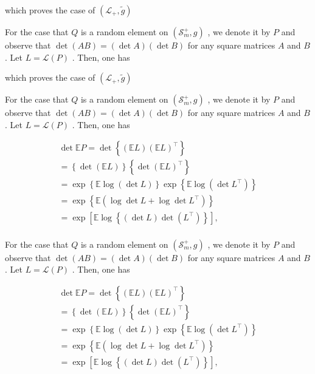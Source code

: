 \documentclass[11pt]{article}
\begin{document}
which proves the case of  $(\mathcal{L}_{+},\tilde{g})$

For the case that  $Q$  is a random element on  $(\mathcal{S}_m^+, g)$ , we denote it by  $P$  and observe that  $\operatorname{det}(AB) = (\operatorname{det} A)(\operatorname{det} B)$  for any square matrices  $A$  and  $B$ . Let  $L = \mathcal{L}(P)$ . Then, one has

which proves the case of  $(\mathcal{L}_{+},\tilde{g})$

For the case that  $Q$  is a random element on  $(\mathcal{S}_m^+, g)$ , we denote it by  $P$  and observe that  $\operatorname{det}(AB) = (\operatorname{det} A)(\operatorname{det} B)$  for any square matrices  $A$  and  $B$ . Let  $L = \mathcal{L}(P)$ . Then, one has

$$
\begin{array}{l} \det  \mathbb {E} P = \det  \left\{\left(\mathbb {E} L\right) \left(\mathbb {E} L\right) ^ {\top} \right\} \\ = \left\{\det  (\mathbb {E} L) \right\} \left\{\det  (\mathbb {E} L) ^ {\top} \right\} \\ = \exp \left\{\mathbb {E} \log (\det  L) \right\} \exp \left\{\mathbb {E} \log (\det  L ^ {\top}) \right\} \\ = \exp \left\{\mathbb {E} \left(\log \det  L + \log \det  L ^ {\top}\right) \right\} \\ = \exp \left[ \mathbb {E} \log \left\{\left(\det  L\right) \det  \left(L ^ {\top}\right) \right\} \right], \\ \end{array}
$$

For the case that  $Q$  is a random element on  $(\mathcal{S}_m^+, g)$ , we denote it by  $P$  and observe that  $\operatorname{det}(AB) = (\operatorname{det} A)(\operatorname{det} B)$  for any square matrices  $A$  and  $B$ . Let  $L = \mathcal{L}(P)$ . Then, one has

$$
\begin{array}{l} \det  \mathbb {E} P = \det  \left\{\left(\mathbb {E} L\right) \left(\mathbb {E} L\right) ^ {\top} \right\} \\ = \left\{\det  (\mathbb {E} L) \right\} \left\{\det  (\mathbb {E} L) ^ {\top} \right\} \\ = \exp \left\{\mathbb {E} \log (\det  L) \right\} \exp \left\{\mathbb {E} \log (\det  L ^ {\top}) \right\} \\ = \exp \left\{\mathbb {E} \left(\log \det  L + \log \det  L ^ {\top}\right) \right\} \\ = \exp \left[ \mathbb {E} \log \left\{\left(\det  L\right) \det  \left(L ^ {\top}\right) \right\} \right], \\ \end{array}
$$
\end{document}
